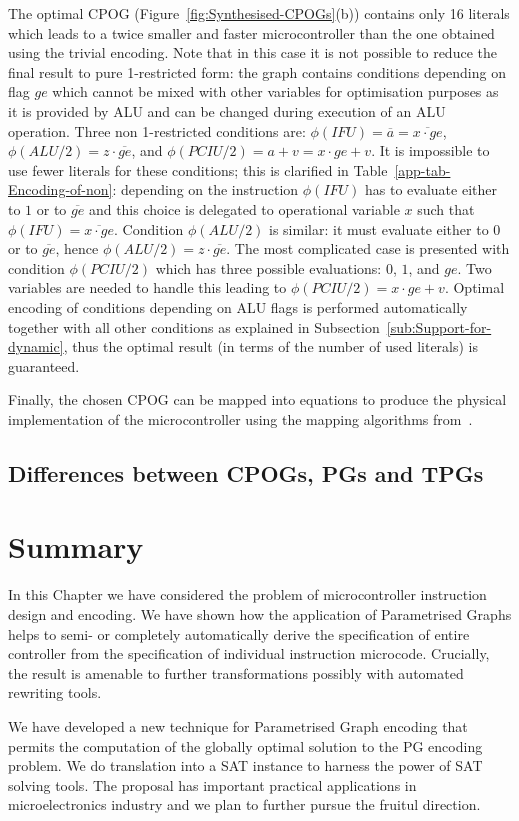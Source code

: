 The optimal CPOG (Figure~\ref{fig:Synthesised-CPOGs}(b)) contains
only 16 literals which leads to a twice smaller and faster microcontroller
than the one obtained using the trivial encoding. Note that in this
case it is not possible to reduce the final result to pure 1-restricted
form: the graph contains conditions depending on flag $ge$ which
cannot be mixed with other variables for optimisation purposes as
it is provided by ALU and can be changed during execution of an ALU
operation. Three non 1-restricted conditions are: $\phi(IFU)=\overline{a}=\overline{x\cdot ge}$,
$\phi(ALU/2)=z\cdot\overline{ge}$, and $\phi(PCIU/2)=a+v=x\cdot ge+v$.
It is impossible to use fewer literals for these conditions; this
is clarified in Table~\ref{app-tab-Encoding-of-non}: depending on
the instruction $\phi(IFU)$ has to evaluate either to $1$ or to
$\overline{ge}$ and this choice is delegated to operational variable
$x$ such that $\phi(IFU)=\overline{x\cdot ge}$. Condition $\phi(ALU/2)$
is similar: it must evaluate either to $0$ or to $\overline{ge}$,
hence $\phi(ALU/2)=z\cdot\overline{ge}$. The most complicated case
is presented with condition $\phi(PCIU/2)$ which has three possible
evaluations: $0$, $1$, and $ge$. Two variables are needed to handle
this leading to $\phi(PCIU/2)=x\cdot ge+v$. Optimal encoding of conditions
depending on ALU flags is performed automatically together with all
other conditions as explained in Subsection~\ref{sub:Support-for-dynamic},
thus the optimal result (in terms of the number of used literals)
is guaranteed.

Finally, the chosen CPOG can be mapped into equations to produce the
physical implementation of the microcontroller using the mapping algorithms
from~\cite{2009_mokhov_phd}\cite{2010_mokhov_ieee}.

\subsection{Differences between CPOGs, PGs and TPGs}




\section{Summary}

In this Chapter we have considered the problem of microcontroller instruction design and encoding. We have shown how the application of Parametrised Graphs helps to semi- or completely automatically derive the specification of entire controller from the specification of individual instruction microcode. Crucially, the result is amenable to further transformations possibly with automated rewriting tools. 

We have developed a new technique for Parametrised Graph encoding that permits the computation of the globally optimal solution to the PG encoding problem. We do translation into a SAT instance to harness the power of SAT solving tools. The proposal has important practical applications in microelectronics industry and we plan to further pursue the fruitul direction.

